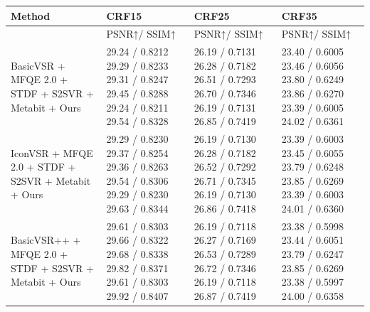 \begin{tabular}{llll}
\toprule
Method & CRF15 & CRF25 & CRF35 \\
\midrule
 & PSNR↑/ SSIM↑ & PSNR↑/ SSIM↑ & PSNR↑/ SSIM↑ \\
BasicVSR + MFQE 2.0 + STDF + S2SVR + Metabit + Ours & 29.24 / 0.8212 29.29 / 0.8233 29.31 / 0.8247 29.45 / 0.8288 29.24 / 0.8211 29.54 / 0.8328 & 26.19 / 0.7131 26.28 / 0.7182 26.51 / 0.7293 26.70 / 0.7346 26.19 / 0.7131 26.85 / 0.7419 & 23.40 / 0.6005 23.46 / 0.6056 23.80 / 0.6249 23.86 / 0.6270 23.39 / 0.6005 24.02 / 0.6361 \\
IconVSR + MFQE 2.0 + STDF + S2SVR + Metabit + Ours & 29.29 / 0.8230 29.37 / 0.8254 29.36 / 0.8263 29.54 / 0.8306 29.29 / 0.8230 29.63 / 0.8344 & 26.19 / 0.7130 26.28 / 0.7182 26.52 / 0.7292 26.71 / 0.7345 26.19 / 0.7130 26.86 / 0.7418 & 23.39 / 0.6003 23.45 / 0.6055 23.79 / 0.6248 23.85 / 0.6269 23.39 / 0.6003 24.01 / 0.6360 \\
BasicVSR++ + MFQE 2.0 + STDF + S2SVR + Metabit + Ours & 29.61 / 0.8303 29.66 / 0.8322 29.68 / 0.8338 29.82 / 0.8371 29.61 / 0.8303 29.92 / 0.8407 & 26.19 / 0.7118 26.27 / 0.7169 26.53 / 0.7289 26.72 / 0.7346 26.19 / 0.7118 26.87 / 0.7419 & 23.38 / 0.5998 23.44 / 0.6051 23.79 / 0.6247 23.85 / 0.6269 23.38 / 0.5997 24.00 / 0.6358 \\
\bottomrule
\end{tabular}
